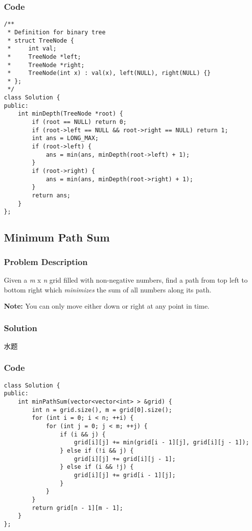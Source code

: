\documentclass[courier]{article}
\begin{document}
\begin{CJK*}{UTF8}{gkai}
\subsubsection*{Code}
\begin{lstlisting}
/**
 * Definition for binary tree
 * struct TreeNode {
 *     int val;
 *     TreeNode *left;
 *     TreeNode *right;
 *     TreeNode(int x) : val(x), left(NULL), right(NULL) {}
 * };
 */
class Solution {
public:
    int minDepth(TreeNode *root) {
        if (root == NULL) return 0;
        if (root->left == NULL && root->right == NULL) return 1;
        int ans = LONG_MAX;
        if (root->left) {
            ans = min(ans, minDepth(root->left) + 1);
        }
        if (root->right) {
            ans = min(ans, minDepth(root->right) + 1);
        }
        return ans;
    }
}; 
\end{lstlisting}


\subsection{ Minimum Path Sum }

\subsubsection*{Problem Description}
Given a \emph{m} x \emph{n} grid filled with non-negative numbers, find a path from top left to bottom right which \emph{minimizes} the sum of all numbers along its path.

\textbf{Note:} You can only move either down or right at any point in time.



\subsubsection*{Solution}
水题

\subsubsection*{Code}
\begin{lstlisting}
class Solution {
public:
    int minPathSum(vector<vector<int> > &grid) {
        int n = grid.size(), m = grid[0].size();
        for (int i = 0; i < n; ++i) {
            for (int j = 0; j < m; ++j) {
                if (i && j) {
                    grid[i][j] += min(grid[i - 1][j], grid[i][j - 1]);
                } else if (!i && j) {
                    grid[i][j] += grid[i][j - 1];
                } else if (i && !j) {
                    grid[i][j] += grid[i - 1][j];
                }
            }
        }
        return grid[n - 1][m - 1];
    }
}; 
\end{lstlisting}



\end{CJK*}
\end{document}
